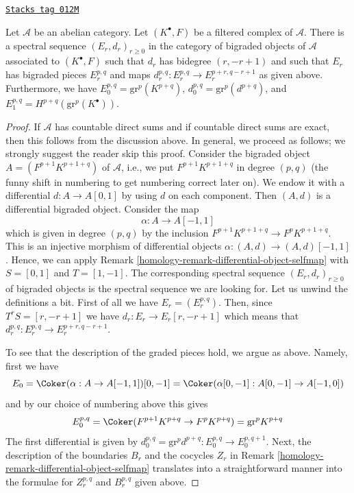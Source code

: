 \begin{lemma}
\label{homology-lemma-spectral-sequence-filtered-complex}
\href{https://stacks.math.columbia.edu/tag/012M}{\texttt{Stacks tag 012M}}

Let $\mathcal{A}$ be an abelian category. Let $(K^\bullet, F)$ be a
filtered complex of $\mathcal{A}$. There is a spectral sequence
$(E_r, d_r)_{r \geq 0}$ in the category of bigraded objects of $\mathcal{A}$
associated to $(K^\bullet, F)$ such that $d_r$ has bidegree $(r, - r + 1)$
and such that $E_r$ has bigraded pieces $E_r^{p, q}$ and maps
$d_r^{p, q} : E_r^{p, q} \to E_r^{p + r, q - r + 1}$ as given above.
Furthermore, we have $E_0^{p, q} = \text{gr}^p(K^{p + q})$,
$d_0^{p, q} = \text{gr}^p(d^{p + q})$,
and $E_1^{p, q} = H^{p + q}(\text{gr}^p(K^\bullet))$.
\end{lemma}

\begin{proof}

If $\mathcal{A}$ has countable direct sums and if countable direct
sums are exact, then this follows from the discussion above.
In general, we proceed as follows; we strongly suggest the reader
skip this proof. Consider the bigraded object $A = (F^{p + 1}K^{p + 1 + q})$
of $\mathcal{A}$, i.e., we put $F^{p + 1}K^{p + 1 + q}$ in degree $(p, q)$
(the funny shift in numbering to get numbering correct later on).
We endow it with a differential $d : A \to A[0, 1]$ by using $d$
on each component. Then $(A, d)$ is a differential bigraded object.
Consider the map
$$
\alpha : A \to A[-1, 1]
$$
which is given in degree $(p, q)$ by the inclusion
$F^{p + 1}K^{p + 1 + q} \to F^pK^{p + 1 + q}$.
This is an injective morphism of differential objects
$\alpha : (A, d) \to (A, d)[-1, 1]$. Hence, we can apply
Remark \ref{homology-remark-differential-object-selfmap}
with $S = [0, 1]$ and $T = [1, -1]$.
The corresponding spectral sequence $(E_r, d_r)_{r \geq 0}$
of bigraded objects is the spectral sequence we are looking
for. Let us unwind the definitions a bit. First of all we have
$E_r = (E_r^{p, q})$. Then, since $T^rS = [r, -r + 1]$
we have $d_r : E_r \to E_r[r, -r + 1]$ which means that
$d_r^{p, q} : E_r^{p, q} \to E_r^{p + r, q - r + 1}$.

\medskip\noindent
To see that the description of the graded pieces hold, we argue
as above. Namely, first we have
$$
E_0 = \Coker(\alpha : A \to A[-1, 1])[0, -1] =
\Coker(\alpha[0, -1] : A[0, -1] \to A[-1, 0])
$$
and by our choice of numbering above this gives
$$
E_0^{p, q} = \Coker(F^{p + 1}K^{p + q} \to F^pK^{p + q}) = \text{gr}^pK^{p + q}
$$
The first differential is given by
$d_0^{p, q} = \text{gr}^pd^{p + q} : E_0^{p, q} \to E_0^{p, q + 1}$.
Next, the description of the boundaries $B_r$ and the cocycles $Z_r$
in Remark \ref{homology-remark-differential-object-selfmap}
translates into a straightforward manner into the formulae
for $Z_r^{p, q}$ and $B_r^{p, q}$ given above.
\end{proof}

